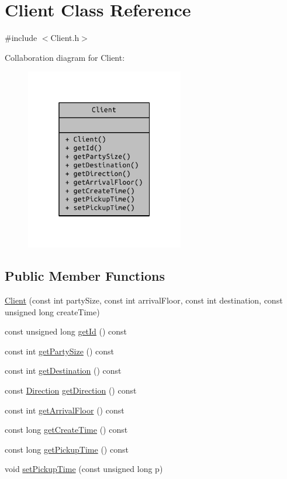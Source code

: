 \hypertarget{class_client}{}\section{Client Class Reference}
\label{class_client}


{\ttfamily \#include $<$Client.\+h$>$}



Collaboration diagram for Client\+:
\nopagebreak
\begin{figure}[H]
\begin{center}
\leavevmode
\includegraphics[width=196pt]{class_client__coll__graph}
\end{center}
\end{figure}
\subsection*{Public Member Functions}
\begin{DoxyCompactItemize}
\item 
\hyperlink{class_client_a6407dd19f039e827716a2190d29775f6}{Client} (const int party\+Size, const int arrival\+Floor, const int destination, const unsigned long create\+Time)
\item 
const unsigned long \hyperlink{class_client_af0e6d1f2202d211d8bb4fdf17e805a17}{get\+Id} () const 
\item 
const int \hyperlink{class_client_a136e2ca6d4a93f5bcb3bd8fe35f406bc}{get\+Party\+Size} () const 
\item 
const int \hyperlink{class_client_a6a596c85feaf3f7dc14c2e90e30a1979}{get\+Destination} () const 
\item 
const \hyperlink{_direction_8h_a224b9163917ac32fc95a60d8c1eec3aa}{Direction} \hyperlink{class_client_a23944e6775bcce17d2127f6f31ccaa5b}{get\+Direction} () const 
\item 
const int \hyperlink{class_client_a08e69644c23ed38659a5f10f4fe5a710}{get\+Arrival\+Floor} () const 
\item 
const long \hyperlink{class_client_ac97f12c81f53b185d04bb99d55ad7994}{get\+Create\+Time} () const 
\item 
const long \hyperlink{class_client_a6f56a7f9c471bd34800c67a2a0e135a9}{get\+Pickup\+Time} () const 
\item 
void \hyperlink{class_client_a7988e646af304d1b62a2d8495d53a34d}{set\+Pickup\+Time} (const unsigned long p)
\end{DoxyCompactItemize}


